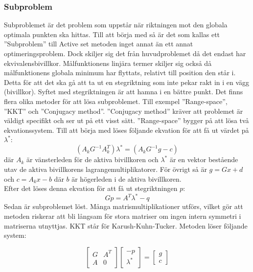 \subsubsection{Subproblem}
Subproblemet är det problem som uppstår när riktningen mot den globala optimala punkten ska hittas. Till att börja med så är det som kallas ett ''Subproblem'' till Active set metoden inget annat än ett annat optimeringsproblem. Dock skiljer sig det från huvudproblemet då det endast har ekvivalensbivillkor. Målfunktionens linjära termer skiljer sig också då målfunktionens globala minimum har flyttats, relativt till position den står i. Detta för att det ska gå att ta ut en stegriktning som inte pekar rakt in i en vägg (bivillkor). Syftet med stegriktningen är att hamna i en bättre punkt. \citep{numericaloptimization}
\newline
\newline
Det finns flera olika metoder för att lösa subproblemet.
Till exempel ''Range-space'', ''KKT'' och ''Conjugacy method''. ''Conjugacy method'' kräver att problemet är väldigt specifikt och ser ut på ett visst sätt. ''Range-space'' bygger på att lösa två ekvationssystem. Till att börja med löses följande ekvation för att få ut värdet på $\lambda^*$:
$$({A_k}G^{-1}A_k^T)\lambda^* = ({A_k}G^{-1}g-c)$$
där $A_k$ är vänsterleden för de aktiva bivillkoren och $\lambda^*$ är en vektor bestående utav de aktiva bivillkorens lagrangemultiplikatorer. För övrigt så är
$g = Gx+d$ och $c = A_kx - b$ där $b$ är högerleden i de aktiva bivillkoren. \\ Efter det löses denna ekvation för att få ut stegriktningen $p$:
$$Gp = A^T\lambda^* - q$$
Sedan är subproblemet löst. Många matrismultiplikationer utförs, vilket gör att metoden riskerar att bli långsam för stora matriser om ingen intern symmetri i matriserna utnyttjas. \citep{numericaloptimization}
\newline
\newline
KKT står för Karush-Kuhn-Tucker. Metoden löser följande system:

$$\begin{bmatrix}
G & A^T \\
A & 0
\end{bmatrix}
\begin{bmatrix}
-p \\
\lambda^*
\end{bmatrix}
=
\begin{bmatrix}
g \\
c
\end{bmatrix}
$$

